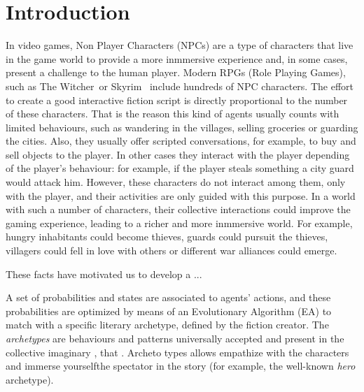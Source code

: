 \documentclass{sig-alternate}
\begin{document}






%
%
\section{Introduction}
\label{sec:intro}

In video games, Non Player Characters (NPCs)  are a type of characters
that live in the game world to provide a more inmmersive
experience and, in some cases, present a challenge to the human player. Modern RPGs (Role Playing Games), such as The
Witcher\texttrademark~or Skyrim\texttrademark~ include hundreds of NPC characters. The effort to create a good interactive fiction script is directly proportional to the number of these characters. That is the reason this kind of agents usually counts with limited behaviours, such as wandering in the villages, selling groceries or guarding the cities. Also, they usually offer scripted conversations, for example, to buy and sell objects to the player. In other cases they interact with the player depending of the player's behaviour: for example, if the player steals something a city guard would attack him.  However, these characters do not interact among them, only with the player, and their activities are only guided with this purpose. In a world with such a number of characters, their collective interactions could improve the gaming experience, leading to a richer and more inmmersive world. For example, hungry inhabitants could become thieves, guards could pursuit the thieves, villagers could fell in love with others or different war alliances could emerge.


These facts have motivated us to develop a ...

A set of probabilities and
states are associated to agents' actions, and these probabilities are
optimized by means of an Evolutionary Algorithm (EA) to match with a
specific literary archetype, defined by the fiction creator. The {\em
archetypes} are behaviours and patterns universally accepted and
present in the collective imaginary
 \cite{ArchetypesGarry05}, that
. Archeto types allows empathize  %
with the characters and immerse yourselfthe spectator in the story
(for example, the well-known {\em hero} archetype).
\end{document}
